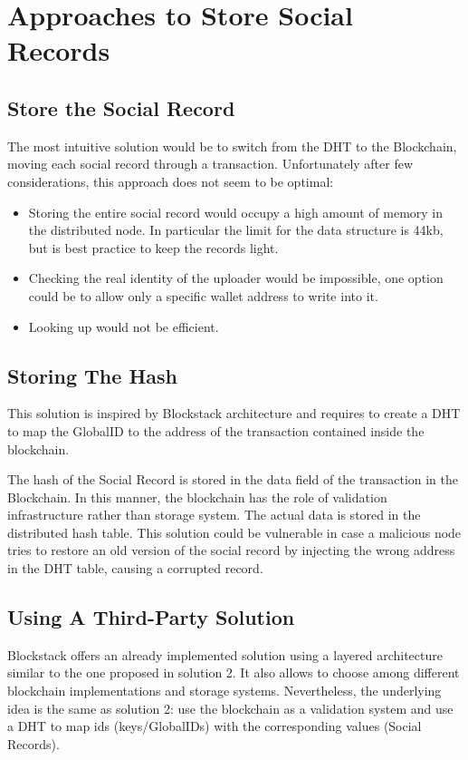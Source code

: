 \section{Approaches to Store Social Records}
\subsection{Store the Social Record}
The most intuitive solution would be to switch from the DHT to the Blockchain, moving each social record through a transaction. 
Unfortunately after few considerations, this approach does not seem to be optimal:
\begin{itemize}
	\item Storing the entire social record would occupy a high amount of memory in the distributed node. 
In particular the limit for the data structure is 44kb, but is best practice to keep the records light.
	\item Checking the real identity of the uploader would be impossible, one option could be to allow only a specific wallet address to write into it.
	\item Looking up would not be efficient.
\end{itemize}

\subsection{Storing The Hash}
This solution is inspired by Blockstack architecture and requires to create a DHT to map the GlobalID to the address of the transaction contained inside the blockchain.

The hash of the Social Record is stored in the data field of the transaction in the Blockchain. In this manner, the blockchain has the role of validation infrastructure rather than storage system. The actual data is stored in the distributed hash table. This solution could be vulnerable in case a malicious node tries to restore an old version of the social record by injecting the wrong address in the DHT table, causing a corrupted record.

\subsection{Using A Third-Party Solution}
Blockstack offers an already implemented solution using a layered architecture similar to the one proposed in solution 2. It also allows to choose among different blockchain implementations and storage systems. Nevertheless, the underlying idea is the same as solution 2: use the blockchain as a validation system and use a DHT to map ids (keys/GlobalIDs) with the corresponding values (Social Records).

